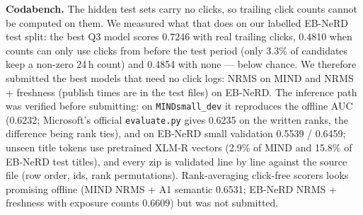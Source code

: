 \documentclass[10pt]{article}
\begin{document}
\textbf{Codabench.} The hidden test sets carry no clicks, so trailing click counts cannot be computed on them. We
measured what that does on our labelled EB-NeRD test split: the best Q3 model scores 0.7246
with real trailing clicks, 0.4810 when counts can only use clicks from before
the test period (only 3.3\% of candidates keep a
non-zero 24\,h count) and 0.4854 with none --- below chance. We therefore submitted the best models
that need no click logs: NRMS on MIND and NRMS + freshness (publish times are in the test files) on EB-NeRD. The
inference path was verified before submitting: on \texttt{MINDsmall\_dev} it reproduces the offline AUC (0.6232;
Microsoft's official \texttt{evaluate.py} gives 0.6235 on the written ranks, the difference being rank ties), and on
EB-NeRD small validation 0.5539 / 0.6459; unseen title tokens use pretrained XLM-R vectors (2.9\% of MIND and 15.8\%
of EB-NeRD test titles), and every zip is validated line by line against the source file (row order, ids, rank
permutations). Rank-averaging click-free scorers looks promising offline (MIND NRMS + A1 semantic
0.6531; EB-NeRD NRMS + freshness with exposure counts
0.6609) but was not submitted.
\end{document}
